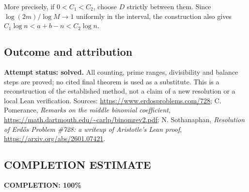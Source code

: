 More precisely, if $0<C_1<C_2$, choose $D$ strictly between them. Since $\log(2m)/\log M\to1$ uniformly in the interval, the construction also gives $C_1\log n<a+b-n<C_2\log n$.

\subsection*{Outcome and attribution}
\textbf{Attempt status: solved.} All counting, prime ranges, divisibility and balance steps are proved; no cited final theorem is used as a substitute. This is a reconstruction of the established method, not a claim of a new resolution or a local Lean verification.
Sources: \url{https://www.erdosproblems.com/728}; C. Pomerance, \emph{Remarks on the middle binomial coefficient}, \url{https://math.dartmouth.edu/~carlp/binomrev2.pdf}; N. Sothanaphan, \emph{Resolution of Erd\H{o}s Problem \#728: a writeup of Aristotle's Lean proof}, \url{https://arxiv.org/abs/2601.07421}.

\subsection*{COMPLETION ESTIMATE}
\textbf{COMPLETION: 100\%}
